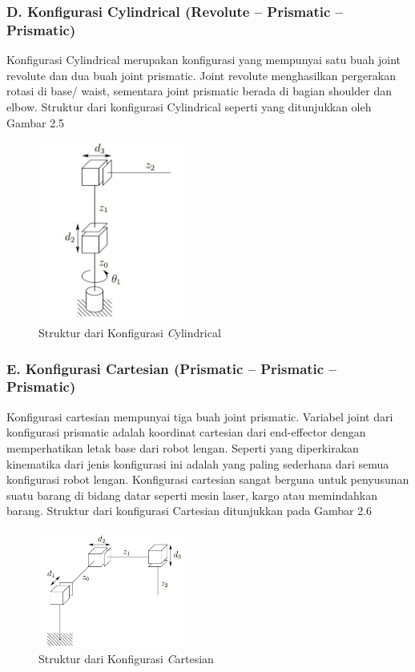 \subsubsection{D. Konfigurasi Cylindrical (Revolute – Prismatic – Prismatic) } 

Konfigurasi Cylindrical merupakan konfigurasi yang mempunyai satu buah joint revolute dan dua buah joint prismatic. Joint revolute menghasilkan pergerakan rotasi di base/ waist, sementara joint prismatic berada di bagian shoulder dan elbow. Struktur dari konfigurasi Cylindrical seperti yang ditunjukkan oleh Gambar 2.5
	\begin{figure}[H]
	\centering
	\includegraphics[width=5cm]{gambar/cylindrical.jpg}
	\caption{Struktur dari Konfigurasi \emph Cylindrical}
\end{figure}
\subsubsection{E. Konfigurasi Cartesian (Prismatic – Prismatic – Prismatic)  } 

Konfigurasi cartesian mempunyai tiga buah joint prismatic. Variabel joint dari konfigurasi prismatic adalah koordinat cartesian dari end-effector dengan memperhatikan letak base dari robot lengan. Seperti yang diperkirakan kinematika dari jenis konfigurasi ini adalah yang paling sederhana dari semua konfigurasi robot lengan. Konfigurasi cartesian sangat berguna untuk penyusunan suatu barang di bidang datar seperti mesin laser, kargo atau memindahkan barang. Struktur dari konfigurasi Cartesian ditunjukkan pada Gambar 2.6

	\begin{figure}[H]
	\centering
	\includegraphics[width=5cm]{gambar/cartesian.jpg}
	\caption{Struktur dari Konfigurasi \emph Cartesian}
\end{figure}

